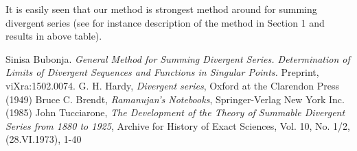 \documentclass[12pt]{article}
\begin{document}
It is easily seen that our method is strongest method around for summing divergent series (see for instance description of the method in Section 1 and results in above table).

\begin{thebibliography}{9}

 Sinisa Bubonja. {\it General Method for Summing Divergent Series. Determination of Limits of Divergent Sequences and Functions in Singular Points.} Preprint, viXra:1502.0074.
 G. H. Hardy, {\it Divergent series}, Oxford at the Clarendon Press (1949) 
 Bruce C. Brendt, {\it Ramanujan's Notebooks}, Springer-Verlag New York Inc. (1985)
 John Tucciarone, {\it The Development of the Theory of Summable Divergent Series from 1880 to 1925}, Archive for History of Exact Sciences, Vol. 10, No. 1/2, (28.VI.1973), 1-40


\end{thebibliography}
\end{document}
